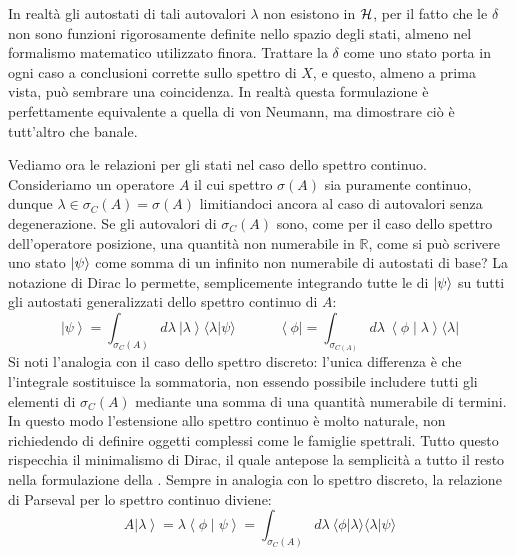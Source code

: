 \documentclass[../../FisicaTeorica.tex]{subfiles}
\begin{document}
In realtà gli autostati di tali autovalori $\lambda$ non esistono in $\mathcal{H}$, per il fatto che le $\delta$ non sono funzioni rigorosamente definite nello spazio degli stati, almeno nel formalismo matematico utilizzato finora.
Trattare la $\delta$ come uno stato  porta in ogni caso a conclusioni corrette sullo spettro di $X$, e questo, almeno a prima vista, può sembrare una coincidenza. In realtà questa formulazione è perfettamente equivalente a quella di von Neumann, ma dimostrare ciò è tutt'altro che banale.

Vediamo ora le relazioni per gli stati nel caso dello spettro continuo. Consideriamo un operatore $A$ il cui spettro $\sigma(A)$ sia puramente continuo, dunque $\lambda \in \sigma_C\left(A\right)=\sigma (A)$
limitiandoci ancora al caso di autovalori senza degenerazione. Se gli autovalori  di $\sigma_C(A)$ sono, come per il caso dello spettro dell'operatore posizione, una quantità non numerabile in $\mathbb R$, come si può scrivere uno stato $\ket\psi$ come somma di un infinito non numerabile di autostati  di base? La notazione di Dirac lo permette, semplicemente integrando tutte le  di $\ket\psi$ su tutti gli autostati generalizzati dello spettro continuo di $A$:
\begin{equation}
\left|\psi\right\rangle= \int_{\sigma_C(A)}{d\lambda\ \left|\lambda\right\rangle\langle\lambda|\psi\rangle } \qquad \quad
\left\langle\phi\right|= \int_{\sigma_{C\left(A\right)}}{d\lambda\ \left\langle\phi\middle|\lambda\right\rangle\langle\lambda|}
\label{eqn:bra-ket-continui}
\end{equation}
Si noti l'analogia con il caso dello spettro discreto: l'unica differenza è che l'integrale sostituisce la sommatoria, non essendo possibile includere tutti gli elementi di $\sigma_C(A)$ mediante una somma di una quantità numerabile di termini. 
In questo modo l'estensione allo spettro continuo è molto naturale, non richiedendo di definire oggetti complessi come le famiglie spettrali. Tutto questo rispecchia il minimalismo di Dirac, il quale antepose la semplicità a tutto il resto nella formulazione della \MQ.
Sempre in analogia con lo spettro discreto, la relazione di Parseval per lo spettro continuo diviene:
\begin{equation}
    A\left|\lambda\right\rangle=\lambda 
\left\langle\phi\middle|\psi\right\rangle= \int_{\sigma_{C}\left(A\right)}{d\lambda\ \langle\phi|\lambda\rangle \langle\lambda|\psi\rangle }
    \label{eqn:parseval-continui}
\end{equation}
\end{document}
